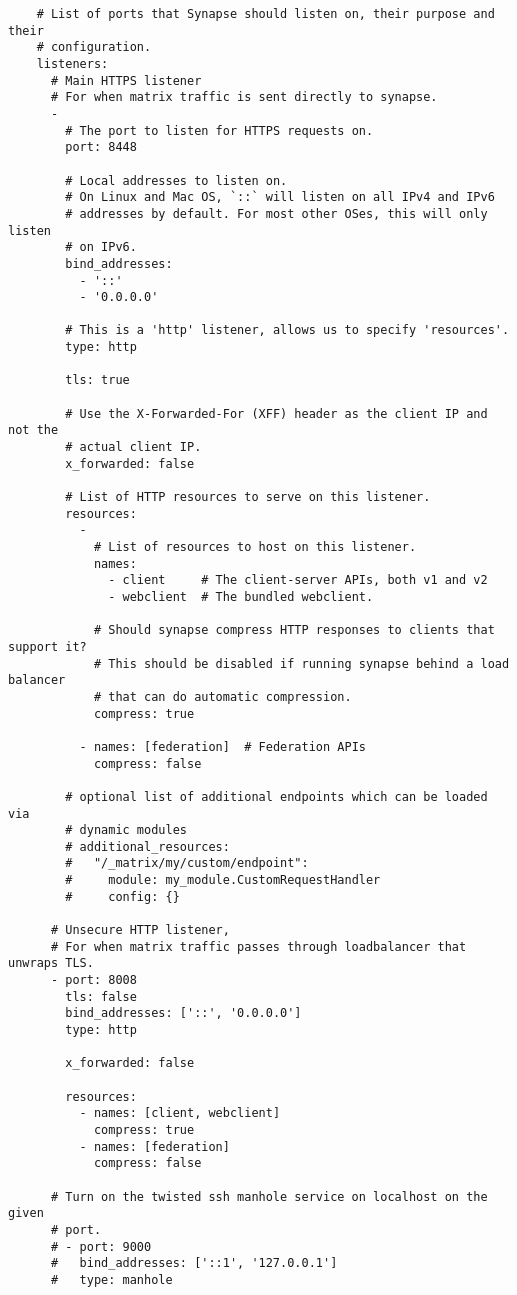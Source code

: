 \begin{lstlisting}
    # List of ports that Synapse should listen on, their purpose and their
    # configuration.
    listeners:
      # Main HTTPS listener
      # For when matrix traffic is sent directly to synapse.
      -
        # The port to listen for HTTPS requests on.
        port: 8448
    
        # Local addresses to listen on.
        # On Linux and Mac OS, `::` will listen on all IPv4 and IPv6
        # addresses by default. For most other OSes, this will only listen
        # on IPv6.
        bind_addresses:
          - '::'
          - '0.0.0.0'
    
        # This is a 'http' listener, allows us to specify 'resources'.
        type: http
    
        tls: true
    
        # Use the X-Forwarded-For (XFF) header as the client IP and not the
        # actual client IP.
        x_forwarded: false
    
        # List of HTTP resources to serve on this listener.
        resources:
          -
            # List of resources to host on this listener.
            names:
              - client     # The client-server APIs, both v1 and v2
              - webclient  # The bundled webclient.
    
            # Should synapse compress HTTP responses to clients that support it?
            # This should be disabled if running synapse behind a load balancer
            # that can do automatic compression.
            compress: true
    
          - names: [federation]  # Federation APIs
            compress: false
    
        # optional list of additional endpoints which can be loaded via
        # dynamic modules
        # additional_resources:
        #   "/_matrix/my/custom/endpoint":
        #     module: my_module.CustomRequestHandler
        #     config: {}
    
      # Unsecure HTTP listener,
      # For when matrix traffic passes through loadbalancer that unwraps TLS.
      - port: 8008
        tls: false
        bind_addresses: ['::', '0.0.0.0']
        type: http
    
        x_forwarded: false
    
        resources:
          - names: [client, webclient]
            compress: true
          - names: [federation]
            compress: false
    
      # Turn on the twisted ssh manhole service on localhost on the given
      # port.
      # - port: 9000
      #   bind_addresses: ['::1', '127.0.0.1']
      #   type: manhole
    

\end{lstlisting}
